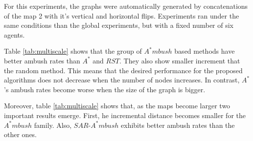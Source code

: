 

For this experiments, the graphs were automatically generated
 by  concatenations of the map 2 with it's vertical and 
 horizontal flips. Experiments ran under the same conditions 
 than the global experiments, but with a fixed 
number of six agents.

Table \ref{tab:multiscale} shows that the group of $A^*mbush$
based methods have better ambush rates than $A^*$ and $RST$.
They also show smaller increment that the random method.
This means that the desired performance for the proposed
 algorithms does not decrease when the number of 
 nodes increases. In contrast, $A^*$'s ambush
 rates become worse when the size of the graph is bigger.
 
Moreover, table \ref{tab:multiscale} shows that, as the maps
 become larger two important results emerge.
 First, he incremental distance becomes smaller for 
the $A^*mbush$ family. Also, $SAR$-$A^*mbush$ exhibits
better ambush rates than the other ones.
 